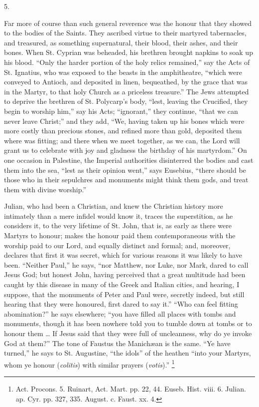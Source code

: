 5.

Far more of course than such general reverence was the honour that
they showed to the bodies of the Saints. They ascribed virtue to their
martyred tabernacles, and treasured, as something supernatural, their
blood, their ashes, and their bones. When St. Cyprian was beheaded,
his brethren brought napkins to soak up his blood. ``Only the
harder portion of the holy relics remained,'' say the Acts of St.
Ignatius, who was exposed to the beasts in the amphitheatre,
``which were conveyed to Antioch, and deposited in linen,
bequeathed, by the grace that was in the Martyr, to that holy Church
as a priceless treasure.'' The Jews attempted to deprive the
brethren of St. Polycarp's body, ``lest, leaving the Crucified,
they begin to worship him,'' say his Acts; ``ignorant,''
they continue, ``that we can never leave Christ;'' and they
add, ``We, having taken up his bones which were more costly than
precious stones, and refined more than gold, deposited them where was
fitting; and there when we meet together, as we can, the Lord will
grant us to celebrate with joy and gladness the birthday of his
martyrdom.'' On one occasion in Palestine, the Imperial
authorities disinterred the bodies and cast them into the sea,
``lest as their opinion went,'' says Eusebius, ``there
should be those who in their sepulchres and monuments might think them
gods, and treat them with divine worship.''

Julian, who had been a Christian, and knew the Christian history
more intimately than a mere infidel would know it, traces the
superstition, as he considers it, to the very lifetime of St. John,
that is, as early as there were Martyrs to honour; makes the honour
paid them contemporaneous with the worship paid to our Lord, and
equally distinct and formal; and, moreover, declares that first it was
secret, which for various reasons it was likely to have been.
``Neither Paul,'' he says, ``nor Matthew, nor Luke, nor
Mark, dared to call Jesus God; but honest John, having perceived that
a great multitude had been caught by this disease in many of the Greek
and Italian cities, and hearing, I suppose, that the monuments of
Peter and Paul were, secretly indeed, but still hearing that they were
honoured, first dared to say it.'' ``Who can feel fitting
abomination?'' he says elsewhere; ``you have filled all places
with tombs and monuments, though it has been nowhere told you to
tumble down at tombs or to honour them … If Jesus said that they
were full of uncleanness, why do ye invoke God at them?'' The tone
of Faustus the Manichæan is the same. ``Ye have turned,'' he
says to St. Augustine, ``the idols'' of the heathen ``into
your Martyrs, whom ye honour (\emph{colitis}) with similar prayers (\emph{votis}).''
\footnote{Act. Procons. 5. Ruinart, Act. Mart. pp. 22,
44. Euseb. Hist. viii. 6. Julian. ap. Cyr. pp. 327, 335. August. c.
Faust. xx. 4.}

